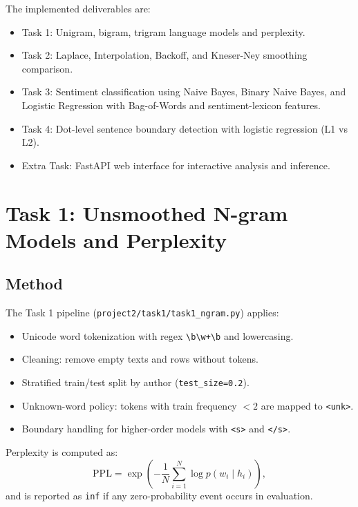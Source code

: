 \documentclass[10pt,a4paper]{article}
\begin{document}
The implemented deliverables are:
\begin{itemize}
    \item Task 1: Unigram, bigram, trigram language models and perplexity.
    \item Task 2: Laplace, Interpolation, Backoff, and Kneser-Ney smoothing comparison.
    \item Task 3: Sentiment classification using Naive Bayes, Binary Naive Bayes, and Logistic Regression with Bag-of-Words and sentiment-lexicon features.
    \item Task 4: Dot-level sentence boundary detection with logistic regression (L1 vs L2).
    \item Extra Task: FastAPI web interface for interactive analysis and inference.
\end{itemize}

\section{Task 1: Unsmoothed N-gram Models and Perplexity}

\subsection{Method}
The Task 1 pipeline (\texttt{project2/task1/task1\_ngram.py}) applies:
\begin{itemize}
    \item Unicode word tokenization with regex \texttt{\textbackslash b\textbackslash w+\textbackslash b} and lowercasing.
    \item Cleaning: remove empty texts and rows without tokens.
    \item Stratified train/test split by author (\texttt{test\_size=0.2}).
    \item Unknown-word policy: tokens with train frequency $<2$ are mapped to \texttt{<unk>}.
    \item Boundary handling for higher-order models with \texttt{<s>} and \texttt{</s>}.
\end{itemize}

Perplexity is computed as:
\[
\mathrm{PPL} = \exp\left(-\frac{1}{N}\sum_{i=1}^{N}\log p(w_i \mid h_i)\right),
\]
and is reported as \texttt{inf} if any zero-probability event occurs in evaluation.
\end{document}
